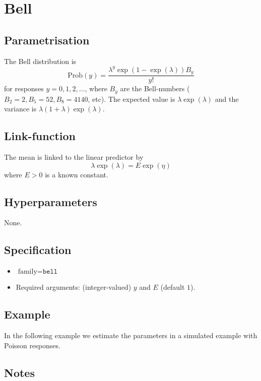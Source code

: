 \documentclass[a4paper,11pt]{article}
\begin{document}
\section*{Bell}

\subsection*{Parametrisation}

The Bell distribution is
\begin{displaymath}
    \text{Prob}(y) = \frac{\lambda^{y} \exp(1-\exp(\lambda)) B_y}{y!}
\end{displaymath}
for responses $y=0, 1, 2, \ldots$, where $B_y$ are the Bell-numbers
($B_2=2, B_5=52, B_8=4140$, etc). The expected value is
$\lambda\exp(\lambda)$ and the variance is
$\lambda(1+\lambda)\exp(\lambda)$.



\subsection*{Link-function}

The mean is linked to the linear predictor by
\begin{displaymath}
    \lambda\exp(\lambda) = E \exp(\eta)
\end{displaymath}
where $E>0$ is a known constant.

\subsection*{Hyperparameters}
None.

\subsection*{Specification}

\begin{itemize}
\item $\text{family}=\texttt{bell}$
\item Required arguments: (integer-valued) $y$ and $E$ (default $1$).
\end{itemize}


\subsection*{Example}

In the following example we estimate the parameters in a simulated
example with Poisson responses.


\subsection*{Notes}
\end{document}
